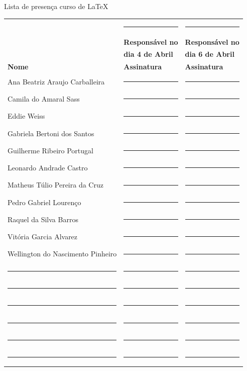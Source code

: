 \documentclass[a4paper,12pt,oneside,brazil,onecolumn]{IEEEtran}
\begin{document}
\begin{center}
		\textcolor{IEEEBlue}{\LARGE Lista de presença curso de \LaTeX}
	\end{center}
	\vspace*{1.5cm}

\begin{tabular}{lll}
				 				  & \rule{4cm}{.1mm} 			&\rule{4cm}{.1mm}			\\[5pt]		
								  & \textbf{Responsável no}		&\textbf{Responsável no} 	\\
					  			  & \textbf{dia 4 de Abril}	 	&\textbf{dia 6 de Abril} 	\\[25pt]
\textbf{Nome}    				  & \textbf{Assinatura} 		&\textbf{Assinatura} 		\\[15pt]
Ana Beatriz Araujo Carballeira    & \rule{4cm}{.1mm} 			&\rule{4cm}{.1mm}			\\[15pt]
Camila do Amaral  Sass            & \rule{4cm}{.1mm} 			&\rule{4cm}{.1mm}			\\[15pt]
Eddie Weiss                       & \rule{4cm}{.1mm} 			&\rule{4cm}{.1mm}			\\[15pt]
Gabriela Bertoni dos Santos       & \rule{4cm}{.1mm} 			&\rule{4cm}{.1mm}			\\[15pt]
Guilherme Ribeiro Portugal        & \rule{4cm}{.1mm} 			&\rule{4cm}{.1mm}			\\[15pt]
Leonardo Andrade Castro           & \rule{4cm}{.1mm} 			&\rule{4cm}{.1mm}			\\[15pt]
Matheus Túlio Pereira da Cruz     & \rule{4cm}{.1mm} 			&\rule{4cm}{.1mm}			\\[15pt]
Pedro Gabriel Lourenço            & \rule{4cm}{.1mm} 			&\rule{4cm}{.1mm}			\\[15pt]
Raquel da Silva Barros            & \rule{4cm}{.1mm} 			&\rule{4cm}{.1mm}			\\[15pt]
Vitória Garcia Alvarez            & \rule{4cm}{.1mm} 			&\rule{4cm}{.1mm}			\\[15pt]
Wellington do Nascimento Pinheiro & \rule{4cm}{.1mm} 			&\rule{4cm}{.1mm}			\\[15pt]
\rule{7cm}{.1mm} 				  & \rule{4cm}{.1mm} 			&\rule{4cm}{.1mm}			\\[15pt]
\rule{7cm}{.1mm} 				  & \rule{4cm}{.1mm} 			&\rule{4cm}{.1mm}			\\[15pt]
\rule{7cm}{.1mm} 				  & \rule{4cm}{.1mm} 			&\rule{4cm}{.1mm}			\\[15pt]
\rule{7cm}{.1mm} 				  & \rule{4cm}{.1mm} 			&\rule{4cm}{.1mm}			\\[15pt]
\rule{7cm}{.1mm} 				  & \rule{4cm}{.1mm} 			&\rule{4cm}{.1mm}			\\[15pt]
\rule{7cm}{.1mm} 				  & \rule{4cm}{.1mm} 			&\rule{4cm}{.1mm}			\\
\end{tabular}
\end{document}
